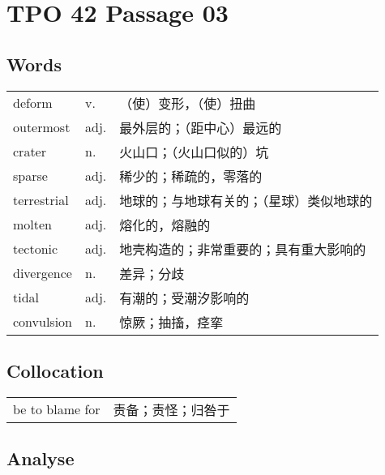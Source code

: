 \section{TPO 42 Passage 03}

\subsection{Words}

\begin{tabular}{lll}
    deform      & v.   & （使）变形，（使）扭曲          \\
    outermost   & adj. & 最外层的；（距中心）最远的        \\
    crater      & n.   & 火山口；（火山口似的）坑         \\
    sparse      & adj. & 稀少的；稀疏的，零落的          \\
    terrestrial & adj. & 地球的；与地球有关的；（星球）类似地球的 \\
    molten      & adj. & 熔化的，熔融的              \\
    tectonic    & adj. & 地壳构造的；非常重要的；具有重大影响的  \\
    divergence  & n.   & 差异；分歧                \\
    tidal       & adj. & 有潮的；受潮汐影响的           \\
    convulsion  & n.   & 惊厥；抽搐，痉挛             \\
\end{tabular}

\subsection{Collocation}

\begin{tabular}{ll}
    be to blame for & 责备；责怪；归咎于 \\
\end{tabular}

\subsection{Analyse}

